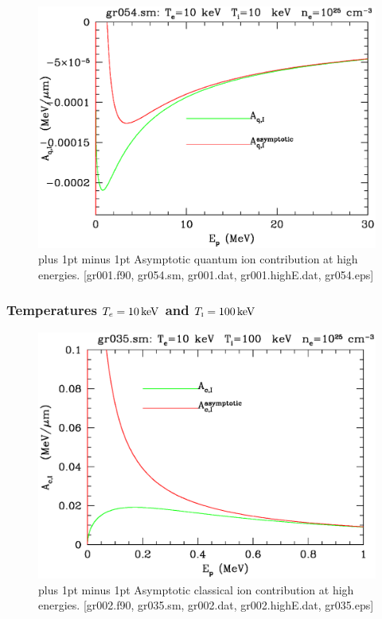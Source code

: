 \documentclass[preprint,12pt,eqsecnum,nofootinbib,amsmath,amssymb]{revtex4}
\newcommand{\smI}{{\rm\scriptscriptstyle I}}
\newcommand{\footnoteskip}{\baselineskip 12pt plus 1pt minus 1pt}
\begin{document}
\vskip-2cm 
\begin{figure}[h!]
\includegraphics[scale=0.45]{gr054.eps} 
\vskip-0.8cm 
\caption{\footnoteskip  
  Asymptotic quantum ion contribution at high energies. [gr001.f90,
  gr054.sm, gr001.dat, gr001.highE.dat, gr054.eps]
}
\label{fig:gr054}
\end{figure}

\pagebreak
\subsubsection{Temperatures $T_e=10\,{\rm keV}$ and $T_\smI=100\,{\rm keV}$}

\vskip-2cm 
\begin{figure}[h!]
\includegraphics[scale=0.45]{gr035.eps} 
\vskip-0.8cm 
\caption{\footnoteskip  
  Asymptotic classical ion contribution at high energies. [gr002.f90,
  gr035.sm, gr002.dat, gr002.highE.dat, gr035.eps]
}
\label{fig:gr035}
\end{figure}
\end{document}
